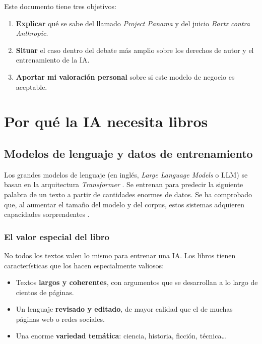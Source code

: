 \documentclass[11pt,a4paper,twoside,openright]{book}
\begin{document}
Este documento tiene tres objetivos:

\begin{enumerate}
  \item \textbf{Explicar} qué se sabe del llamado \textit{Project Panama} y del
        juicio \textit{Bartz contra Anthropic}.
  \item \textbf{Situar} el caso dentro del debate más amplio sobre los derechos de
        autor y el entrenamiento de la IA.
  \item \textbf{Aportar mi valoración personal} sobre si este modelo de negocio es
        aceptable.
\end{enumerate}

\chapter{Por qué la IA necesita libros}

\section{Modelos de lenguaje y datos de entrenamiento}

Los grandes modelos de lenguaje (en inglés, \textit{Large Language Models} o LLM)
se basan en la arquitectura \textit{Transformer} \cite{vaswani2017}. Se entrenan
para predecir la siguiente palabra de un texto a partir de cantidades enormes de
datos. Se ha comprobado que, al aumentar el tamaño del modelo y del corpus, estos
sistemas adquieren capacidades sorprendentes \cite{brown2020}.

\subsection{El valor especial del libro}

No todos los textos valen lo mismo para entrenar una IA. Los libros tienen
características que los hacen especialmente valiosos:

\begin{itemize}
  \item Textos \textbf{largos y coherentes}, con argumentos que se desarrollan a lo
        largo de cientos de páginas.
  \item Un lenguaje \textbf{revisado y editado}, de mayor calidad que el de muchas
        páginas web o redes sociales.
  \item Una enorme \textbf{variedad temática}: ciencia, historia, ficción, técnica\ldots
\end{itemize}
\end{document}
